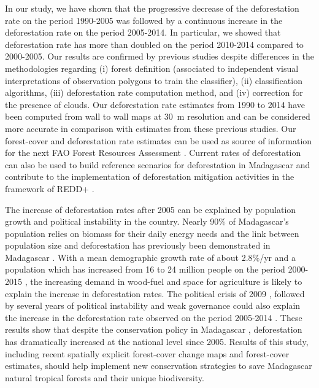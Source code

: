\documentclass[essd, classical]{copernicus}
\begin{document}
In our study, we have shown that the progressive decrease of the
deforestation rate on the period 1990-2005 was followed by a
continuous increase in the deforestation rate on the period
2005-2014. In particular, we showed that deforestation rate has more
than doubled on the period 2010-2014 compared to 2000-2005. Our
results are confirmed by previous studies \citep{Harper2007, MEFT2009,
  ONE2015} despite differences in the methodologies regarding (i)
forest definition (associated to independent visual interpretations of
observation polygons to train the classifier), (ii) classification
algorithms, (iii) deforestation rate computation method, and (iv)
correction for the presence of clouds. Our deforestation rate
estimates from 1990 to 2014 have been computed from wall to wall maps
at 30~m resolution and can be considered more accurate in comparison
with estimates from these previous studies. Our forest-cover and
deforestation rate estimates can be used as source of information for
the next FAO Forest Resources Assessment \citep{Keenan2015}. Current
rates of deforestation can also be used to build reference scenarios
for deforestation in Madagascar and contribute to the implementation
of deforestation mitigation activities in the framework of REDD+
\citep{Olander2008}.

The increase of deforestation rates after 2005 can be explained by
population growth and political instability in the country. Nearly
90\% of Madagascar's population relies on biomass for their daily
energy needs \citep{Minten2013} and the link between population size
and deforestation has previously been demonstrated in Madagascar
\citep{Vieilledent2013, Gorenflo2011}. With a mean demographic growth
rate of about 2.8\%/yr and a population which has increased from 16 to
24 million people on the period 2000-2015 \citep{UN2015}, the
increasing demand in wood-fuel and space for agriculture is likely to
explain the increase in deforestation rates. The political crisis of
2009 \citep{Ploch2012}, followed by several years of political
instability and weak governance could also explain the increase in the
deforestation rate observed on the period 2005-2014
\citep{Smith2003}. These results show that despite the conservation
policy in Madagascar \citep{Freudenberger2010}, deforestation has
dramatically increased at the national level since 2005. Results of
this study, including recent spatially explicit forest-cover change
maps and forest-cover estimates, should help implement new
conservation strategies to save Madagascar natural tropical forests
and their unique biodiversity.
\end{document}
